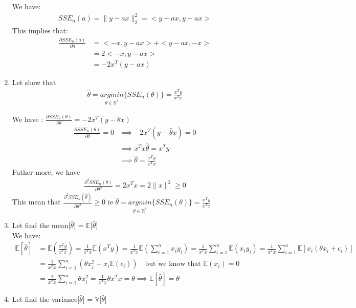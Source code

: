 \documentclass[12pt,a4paper]{article}
\begin{document}
\begin{enumerate}
We have:
\begin{align}
	SSE_{n}(a) = \|y-ax\|_{2}^{2}= <y-ax,y-ax>
\end{align}
This implies that:\begin{align*}
\frac{\partial SSE_{n}(a)}{\partial a}&=<-x, y-ax>+<y-ax,-x>\\
& = 2<-x,y-ax>\\
& = -2x^{T}(y-ax)
\end{align*}
\item Let show that \begin{align}
	\hat{\theta} = \underset{\theta\in\mathbb{R^{*}}}{argmin}\{SSE_{n}(\theta)\} = \frac{x^{T}y}{x^{T}x}
\end{align}

We have : $\frac{\partial SSE_{n}(\theta)}{\partial \theta} = -2x^{T}(y-\theta x) $
\begin{align*}
	\frac{\partial SSE_{n}(\theta)}{\partial \theta} =0&\implies -2x^{T}(y-\hat\theta x)=0\\
	&\implies x^{T}x\hat\theta = x^{T}y\\
	&\implies \hat{\theta} = \frac{x^{T}y}{x^{T}x}
\end{align*}
Futher more, we have \begin{align}
\frac{\partial^{2} SSE_{n}(\theta)}{\partial \theta^{2}}=2x^{T}x=2\|x\|^{2}\geq0
\end{align}
This mean that $\frac{\partial^{2} SSE_{n}(\hat\theta)}{\partial \theta^{2}}\geqslant0$
ie $\hat{\theta}=\underset{\theta\in\mathbb{R^{*}}}{argmin}\{SSE_{n}(\theta)\} = \frac{x^{T}y}{x^{T}x}$

\item Let find the mean[$\hat\theta$] = $\mathbb{E}$[$\hat\theta$]\\

We have:\begin{align*}
	\mathbb{E}[\hat\theta]& = \mathbb{E}\left(\frac{x^{T}y}{x^{T}x}\right)
	 = \frac{1}{x^{T}x}\mathbb{E}(x^{T}y)
	 = \frac{1}{x^{T}x}\mathbb{E}(\sum_{i=1}^{n}x_{i}y_{i})
	 = \frac{1}{x^{T}x}\sum_{i=1}^{n}\mathbb{E}(x_{i}y_{i})
	 = \frac{1}{x^{T}x}\sum_{i=1}^{n}\mathbb{E}[x_{i}(\theta x_{i}+\epsilon_{i})]\\
	& = \frac{1}{x^{T}x}\sum_{i=1}^{n}(\theta x_{i}^{2}+x_{i}\mathbb{E}(\epsilon_{i}))\quad \text{but we know that $\mathbb{E}(x_{i})=0$}\\
	& = \frac{1}{x^{T}x}\sum_{i=1}^{n}\theta x_{i}^{2} = \frac{1}{x^{T}x}\theta x^{T}x = \theta\implies \mathbb{E}[\hat\theta] = \theta
	\end{align*}
\item Let find the variance[$\hat\theta$] = $\mathbb{V}$[$\hat\theta$]\\


\end{enumerate}
\end{document}
